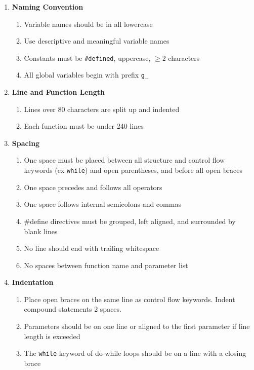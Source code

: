 \documentclass[sigconf]{acmart}
\begin{document}
\begin{enumerate}[label=\Roman*.,ref=\Roman*,]%
    \item \textbf{Naming Convention}
    \begin{enumerate}[left=\itemindent, label=\theenumi.\Alph*,ref=\theenumi.\Alph*]
        \item Variable names should be in all lowercase
        \item Use descriptive and meaningful variable names
        \item Constants must be \texttt{\#defined}, uppercase, $\geq2$ characters
        \item All global variables begin with prefix \texttt{g\_}
    \end{enumerate}
    \label{itm:codestandard}
    
    \item \textbf{Line and Function Length}
    \begin{enumerate}[left=\itemindent,label=\theenumi.\Alph*,ref=\theenumi.\Alph*]
        \item Lines over 80 characters are split up and indented
        \item Each function must be under 240 lines
    \end{enumerate}
    
    \item \textbf{Spacing}
    \begin{enumerate}[left=\itemindent,label=\theenumi.\Alph*,ref=\theenumi.\Alph*]
        \item One space must be placed between all structure and control flow keywords (ex \texttt{while}) and open parentheses, and before all open braces
        \item One space precedes and follows all operators
        \item One space follows internal semicolons and commas
        \item \#define directives must be grouped, left aligned, and surrounded by blank lines
        \item No line should end with trailing whitespace
        \item No spaces between function name and parameter list
    \end{enumerate}
    
    \item \textbf{Indentation}
    \begin{enumerate}[left=\itemindent,label=\theenumi.\Alph*,ref=\theenumi.\Alph*]
        \item Place open braces on the same line as control flow keywords. Indent compound statements 2 spaces.
        \item Parameters should be on one line or aligned to the first parameter if line length is exceeded
        \item The \texttt{while} keyword of do-while loops should be on a line with a closing brace
    \end{enumerate}
    

\end{enumerate}
\end{document}
